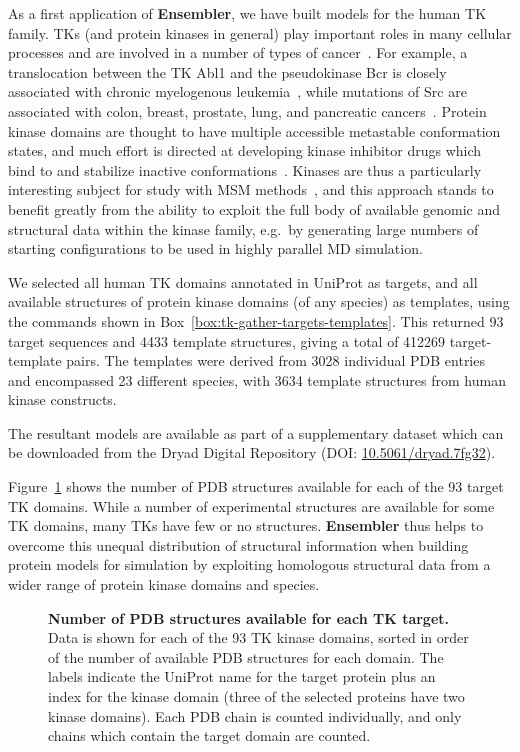 \documentclass[10pt,letterpaper]{article}
\begin{document}
As a first application of {\bf Ensembler}, we have built models for the human TK family.
TKs (and protein kinases in general) play important roles in many cellular processes and are involved in a number of types of cancer~\cite{krause:nejm:2005:tks-cancer}.
For example, a translocation between the TK Abl1 and the pseudokinase Bcr is closely associated with chronic myelogenous leukemia~\cite{greuber:2013:abl-cancer-review}, while mutations of Src are associated with colon, breast, prostate, lung, and pancreatic cancers~\cite{kim:2009:src-cancer-review}.
Protein kinase domains are thought to have multiple accessible metastable conformation states, and much effort is directed at developing kinase inhibitor drugs which bind to and stabilize inactive conformations~\cite{liu:ncb:2006:kinase-inhibitors-inactive-conformations}.
Kinases are thus a particularly interesting subject for study with MSM methods~\cite{shukla-pande:nature-commun:2014:src-activation-msm}, and this approach stands to benefit greatly from the ability to exploit the full body of available genomic and structural data within the kinase family, e.g.~by generating large numbers of starting configurations to be used in highly parallel MD simulation.

We selected all human TK domains annotated in UniProt as targets, and all available structures of protein kinase domains (of any species) as templates, using the commands shown in Box~\ref{box:tk-gather-targets-templates}.
This returned 93 target sequences and 4433 template structures, giving a total of \num{412269} target-template pairs.
The templates were derived from 3028 individual PDB entries and encompassed 23 different species, with 3634 template structures from human kinase constructs.

The resultant models are available as part of a supplementary dataset which can be downloaded from the Dryad Digital Repository (DOI: \href{http://datadryad.org/review?doi=doi:10.5061/dryad.7fg32}{10.5061/dryad.7fg32}).

Figure~\ref{figure:nstructures-per-tk-target} shows the number of PDB structures available for each of the 93 target TK domains.
While a number of experimental structures are available for some TK domains, many TKs have few or no structures. 
{\bf Ensembler} thus helps to overcome this unequal distribution of structural information when building protein models for simulation by exploiting homologous structural data from a wider range of protein kinase domains and species.

\begin{figure}[h]
    \caption{{\bf Number of PDB structures available for each TK target.}
    Data is shown for each of the 93 TK kinase domains, sorted in order of the number of available PDB structures for each domain. 
    The labels indicate the UniProt name for the target protein plus an index for the kinase domain (three of the selected proteins have two kinase domains). 
    Each PDB chain is counted individually, and only chains which contain the target domain are counted.
}
    \label{figure:nstructures-per-tk-target}
\end{figure}
\end{document}
